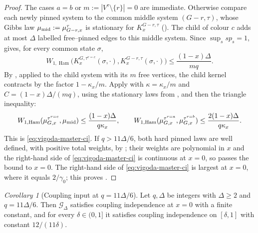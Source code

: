 \documentclass[11pt,reqno]{article}
\theoremstyle{plain}
\newtheorem{corollary}[theorem]{Corollary}
\theoremstyle{definition}
\theoremstyle{remark}
\newtheorem{corollary}[corollary]{Corollary}
\theoremstyle{definition}
\theoremstyle{remark}
\DeclareMathOperator{\Ham}{Ham}
\newcommand{\Deg}{\Delta}                        %
\newcommand{\WHam}{W_{1,\Ham}}                   %
\newcommand{\Gdeg}{\mathcal{G}_{\Deg}}
\newcommand{\mupin}[3]{\mu_{#1,#3}^{#2}}
\newcommand{\gapq}{\gamma_0}
\newcommand{\softK}{K}
\begin{document}
\begin{proof}
The cases \(a=b\) or \(m:=|V^\tau\setminus\{r\}|=0\) are immediate.
Otherwise compare each newly pinned system to the common middle system
\((G-r,\tau)\), whose Gibbs law \(\mu_{\rm mid}:=\mupin{G-r}{\tau}{x}\) is
stationary for \(\softK_x^{G-r,\tau}\) ().
The child of colour \(c\) adds at most \(\Deg\) labelled free--pinned
edges to this middle system.  Since \(\sup_s sp_s=1\),
 gives, for every common state \(\sigma\),
\begin{equation}\label{eq:soft-child-middle-row}
  \WHam\bigl(\softK_x^{G,\tau^{r=c}}(\sigma,\cdot),
              \softK_x^{G-r,\tau}(\sigma,\cdot)\bigr)
  \le\frac{(1-x)\Deg}{mq}.
\end{equation}
By , applied to the child system with its
\(m\) free vertices, the child kernel contracts by the factor
\(1-\kappa_x/m\).
Apply  with \(\kappa=\kappa_x/m\) and
\(C=(1-x)\Deg/(mq)\), using the stationary laws from
, and then the triangle inequality:
\[
  \WHam(\mupin{G}{\tau^{r=c}}{x},\mu_{\rm mid})
  \le\frac{(1-x)\Deg}{q\kappa_x},
  \qquad
  \WHam(\mupin{G}{\tau^{r=a}}{x},\mupin{G}{\tau^{r=b}}{x})
  \le\frac{2(1-x)\Deg}{q\kappa_x}.
\]
This is \eqref{eq:vigoda-master-ci}.  If \(q>11\Deg/6\), both hard
pinned laws are well defined, with positive total weights, by
; their weights are polynomial in \(x\) and the
right-hand side of \eqref{eq:vigoda-master-ci} is continuous at \(x=0\),
so  passes the bound to \(x=0\).
The right-hand side of \eqref{eq:vigoda-master-ci} is largest at
\(x=0\), where it equals \(2/\gapq\); this proves .
\end{proof}

\begin{corollary}[Coupling input at \texorpdfstring{\(q=11\Deg/6\)}{q=11Delta/6}]
\label{cor:critical-line-input}
Let \(q,\Deg\) be integers with \(\Deg\ge2\) and \(q=11\Deg/6\).
Then \(\Gdeg\) satisfies coupling independence at \(x=0\) with a finite
constant, and for every \(\delta\in(0,1]\) it satisfies coupling
independence on \([\delta,1]\) with constant \(12/(11\delta)\).
\end{corollary}
\end{document}
